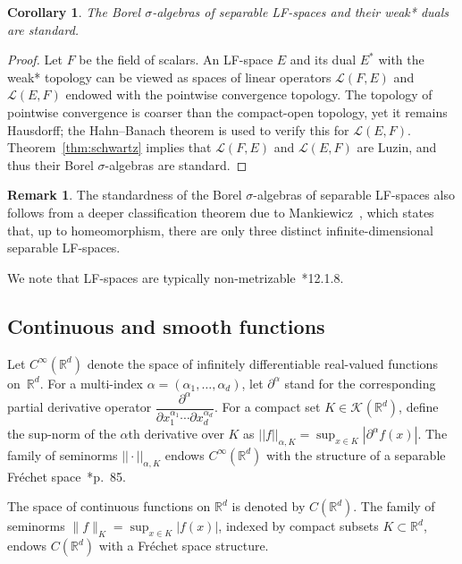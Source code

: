 \documentclass[12pt]{paper}
\numberwithin{equation}{section}
\theoremstyle{plain}
\newtheorem{corollary}[theorem]{Corollary}
\theoremstyle{definition}
\newtheorem{remark}[theorem]{Remark}
\newcommand{\Rd}{\mathbb{R}^{d}}
\newcommand{\vietoris}[2][]{\mathcal{K}_{#1}(#2)}
\newcommand{\smooth}[2][]{C^{\infty}_{#1}(#2)}
\newcommand{\norm}[1]{||#1||}
\begin{document}
\begin{corollary}
  \label{cor:lf-dual-lf-standard}
  The Borel \(\sigma\)-algebras of separable LF-spaces and their weak* duals are standard.
\end{corollary}
\begin{proof}
  Let \(F\) be the field of scalars.  An LF-space \(E\) and its dual \(E^{*}\) with the weak*
  topology can be viewed as spaces of linear operators \(\mathcal{L}(F,E)\) and \(\mathcal{L}(E,F)\)
  endowed with the pointwise convergence topology.  The topology of pointwise convergence is coarser
  than the compact-open topology, yet it remains Hausdorff; the Hahn–Banach theorem is used to
  verify this for \(\mathcal{L}(E,F)\).  Theorem~\ref{thm:schwartz} implies that
  \(\mathcal{L}(F,E)\) and \(\mathcal{L}(E,F)\) are Luzin, and thus their Borel \(\sigma\)-algebras
  are standard.
\end{proof}

\begin{remark}
  \label{rem:lf-classification}
  The standardness of the Borel \(\sigma\)-algebras of separable LF-spaces also follows from a
  deeper classification theorem due to Mankiewicz~\cite{mankiewiczTopologicalLipschitzUniform1974},
  which states that, up to homeomorphism, there are only three distinct infinite-dimensional
  separable LF-spaces.
\end{remark}

We note that LF-spaces are typically
non-metrizable~\cite{nariciTopologicalVectorSpaces2010}*{12.1.8}.

\subsection{Continuous and smooth functions}
\label{sec:comp-supp-funct}
Let \(\smooth{\Rd}\) denote the space of infinitely differentiable real-valued functions on~\(\Rd\).
For a multi-index \(\alpha = (\alpha_{1}, \ldots, \alpha_{d})\), let \(\partial^{\alpha}\) stand for
the corresponding partial derivative operator
\(\dfrac{\partial^{\alpha}}{\partial x_{1}^{\alpha_{1}} \cdots \partial x_{d}^{\alpha_{d}}}\). For a
compact set \(K \in \vietoris{\Rd}\), define the sup-norm of the \(\alpha\)th derivative over \(K\)
as \(\norm{f}_{\alpha,K} = \sup_{x \in K}|\partial^{\alpha}f(x)|\).  The family of seminorms
\(\norm{\cdot}_{\alpha, K}\) endows \(\smooth{\Rd}\) with the structure of a separable Fr\'echet
space~\cite{trevesTopologicalVectorSpaces2006}*{p.~85}.

The space of continuous functions on \(\Rd\) is denoted by \(C(\Rd)\). The family of seminorms
\(\| f \|_K = \sup_{x \in K} |f(x)|\), indexed by compact subsets \(K \subset \Rd\), endows
\(C(\Rd)\) with a Fr\'echet space structure.
\end{document}
